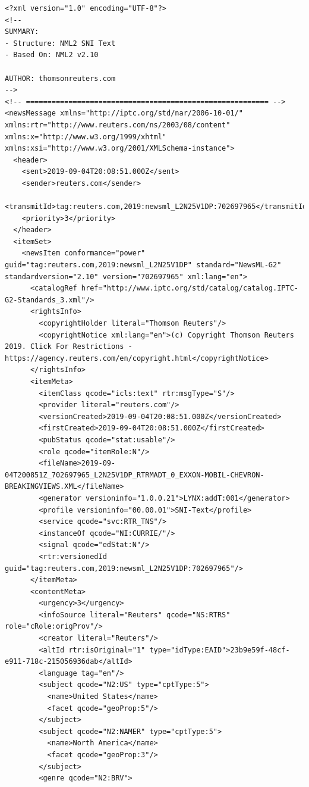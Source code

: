 \documentclass[11pt]{article}
\begin{document}
\begin{lstlisting}[basicstyle=\tiny]
<?xml version="1.0" encoding="UTF-8"?>
<!-- 
SUMMARY: 
- Structure: NML2 SNI Text 
- Based On: NML2 v2.10

AUTHOR: thomsonreuters.com
-->
<!-- ========================================================= -->
<newsMessage xmlns="http://iptc.org/std/nar/2006-10-01/" xmlns:rtr="http://www.reuters.com/ns/2003/08/content" xmlns:x="http://www.w3.org/1999/xhtml" xmlns:xsi="http://www.w3.org/2001/XMLSchema-instance">
  <header>
    <sent>2019-09-04T20:08:51.000Z</sent>
    <sender>reuters.com</sender>
    <transmitId>tag:reuters.com,2019:newsml_L2N25V1DP:702697965</transmitId>
    <priority>3</priority>
  </header>
  <itemSet>
    <newsItem conformance="power" guid="tag:reuters.com,2019:newsml_L2N25V1DP" standard="NewsML-G2" standardversion="2.10" version="702697965" xml:lang="en">
      <catalogRef href="http://www.iptc.org/std/catalog/catalog.IPTC-G2-Standards_3.xml"/>
      <rightsInfo>
        <copyrightHolder literal="Thomson Reuters"/>
        <copyrightNotice xml:lang="en">(c) Copyright Thomson Reuters 2019. Click For Restrictions - https://agency.reuters.com/en/copyright.html</copyrightNotice>
      </rightsInfo>
      <itemMeta>
        <itemClass qcode="icls:text" rtr:msgType="S"/>
        <provider literal="reuters.com"/>
        <versionCreated>2019-09-04T20:08:51.000Z</versionCreated>
        <firstCreated>2019-09-04T20:08:51.000Z</firstCreated>
        <pubStatus qcode="stat:usable"/>
        <role qcode="itemRole:N"/>
        <fileName>2019-09-04T200851Z_702697965_L2N25V1DP_RTRMADT_0_EXXON-MOBIL-CHEVRON-BREAKINGVIEWS.XML</fileName>
        <generator versioninfo="1.0.0.21">LYNX:addT:001</generator>
        <profile versioninfo="00.00.01">SNI-Text</profile>
        <service qcode="svc:RTR_TNS"/>
        <instanceOf qcode="NI:CURRIE/"/>
        <signal qcode="edStat:N"/>
        <rtr:versionedId guid="tag:reuters.com,2019:newsml_L2N25V1DP:702697965"/>
      </itemMeta>
      <contentMeta>
        <urgency>3</urgency>
        <infoSource literal="Reuters" qcode="NS:RTRS" role="cRole:origProv"/>
        <creator literal="Reuters"/>
        <altId rtr:isOriginal="1" type="idType:EAID">23b9e59f-48cf-e911-718c-215056936dab</altId>
        <language tag="en"/>
        <subject qcode="N2:US" type="cptType:5">
          <name>United States</name>
          <facet qcode="geoProp:5"/>
        </subject>
        <subject qcode="N2:NAMER" type="cptType:5">
          <name>North America</name>
          <facet qcode="geoProp:3"/>
        </subject>
        <genre qcode="N2:BRV">

\end{lstlisting}
\end{document}
